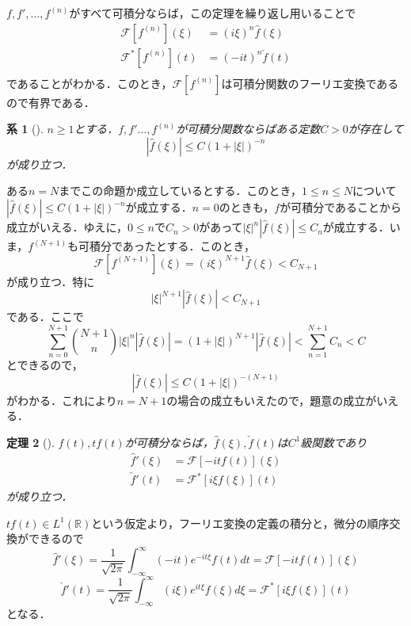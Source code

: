 \documentclass[dvipdfmx,a4j,10pt]{jsarticle}
\makeatletter
\theoremstyle{mystyle1}
\newtheorem{theorem}{定理}[section]
\newtheorem{corollary}[theorem]{系}
\theoremstyle{mystyle3}
\theoremstyle{mystyle4}
\theoremstyle{mystyle6}
\theoremstyle{mystyle2}
\theoremstyle{mystyle5}
\renewenvironment{proof}[1][\proofname]{\par
  \pushQED{\qed}%
  \normalfont
  \topsep6\p@\@plus6\p@ \trivlist
  \item[\hskip\labelsep{\bfseries\sffamily #1}]\ignorespaces
}{%
  \popQED\endtrivlist\@endpefalse
}
\renewcommand\proofname{証明}
\newenvironment{cor}[1][]
{\begin{tcolorbox}[
    enhanced,
    boxrule=0pt,
    arc=0mm,
    frame hidden,
    borderline west={2pt}{-4pt}{blue!50!black},
    breakable = true
    ]
    \begin{corollary}[#1]
}
{\end{corollary}\end{tcolorbox}}
\newenvironment{thm}[1][]
{\begin{tcolorbox}[
    enhanced,
    boxrule=0pt,
    arc=0mm,
    frame hidden,
    borderline west={2pt}{-4pt}{red},
    breakable = true
    ]
    \begin{theorem}[#1]
}
{\end{theorem}\end{tcolorbox}}
\makeatother
\begin{document}
$f,f',\ldots,f^{(n)}$がすべて可積分ならば，この定理を繰り返し用いることで
\[
	\begin{split}
		\mathcal{F}[f^{(n)}](\xi)&=(i\xi)^n\hat f(\xi) \\
		\mathcal{F}^*[f^{(n)}](t)&=(-it)^n\check f(t) \\
	\end{split}
\]
であることがわかる．このとき，$\mathcal{F}[f^{(n)}]$は可積分関数のフーリエ変換であるので有界である．

\begin{cor}\label{cor:3-10}
	$n\geq 1$とする．$f,f'\ldots,f^{(n)}$が可積分関数ならばある定数$C>0$が存在して
	\[
		|\hat f(\xi)|\leq C(1+|\xi|)^{-n}
	\]
	が成り立つ．
\end{cor}

\begin{proof}
	ある$n=N$までこの命題か成立しているとする．このとき，$1\leq n\leq N$について$|\hat f(\xi)|\leq C(1+|\xi|)^{-n}$が成立する．$n=0$のときも，$f$が可積分であることから成立がいえる．ゆえに，$0\leq n$で$C_n>0$があって$|\xi|^n|\hat f(\xi)|\leq C_n$が成立する．いま，$f^{(N+1)}$も可積分であったとする．このとき，
	\[
		\mathcal{F}[f^{(N+1)}](\xi)=(i\xi)^{N+1}\hat f(\xi)< C_{N+1}
	\]
	が成り立つ．特に
	\[
		|\xi|^{N+1}|\hat f(\xi)|<C_{N+1}
	\]
	である．ここで
	\[
		\sum_{n=0}^{N+1} \binom{N+1}{n} |\xi|^n|\hat f(\xi)|=(1+|\xi|)^{N+1}|\hat f(\xi)|<\sum_{n=1}^{N+1} C_n<C
	\]
	とできるので，
	\[
		|\hat f(\xi)|\leq C(1+|\xi|)^{-(N+1)}
	\]
	がわかる．これにより$n=N+1$の場合の成立もいえたので，題意の成立がいえる．
\end{proof}

\begin{thm}\label{thm:3-11}
	$f(t),tf(t)$が可積分ならば，$\hat f(\xi),\check f(t)$は$C^1$級関数であり
	\[
		\begin{split}
			\hat f'(\xi)&=\mathcal{F}[-itf(t)](\xi)\\
			\check f'(t)&=\mathcal{F}^*[i\xi f(\xi)](t)
		\end{split}
	\]
	が成り立つ．
\end{thm}

\begin{proof}
	$tf(t)\in L^1(\mathbb{R})$という仮定より，フーリエ変換の定義の積分と，微分の順序交換ができるので
	\[
		\hat f'(\xi)=\frac{1}{\sqrt{2\pi}}\int_{-\infty}^\infty (-it)e^{-it\xi}f(t)dt=\mathcal{F}[-itf(t)](\xi)
	\]
	\[
		\check f'(t)=\frac{1}{\sqrt{2\pi}}\int_{-\infty}^\infty (i\xi)e^{it\xi}f(\xi)d\xi=\mathcal{F}^*[i\xi f(\xi)](t)
	\]
	となる．
\end{proof}
\end{document}
